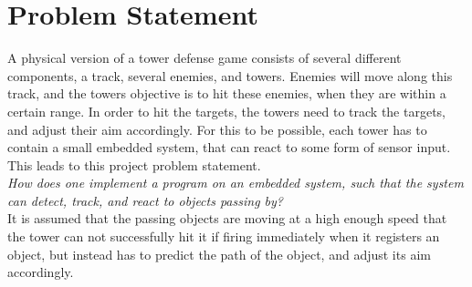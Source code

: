 \section{Problem Statement}\label{sec:problemstatement}\label{\automlabel}
A physical version of a tower defense game consists of several different components, a track, several enemies, and towers. Enemies will move along this track, and the towers objective is to hit these enemies, when they are within a certain range. In order to hit the targets, the towers need to track the targets, and adjust their aim accordingly. For this to be possible, each tower has to contain a small embedded system, that can react to some form of sensor input. This leads to this project problem statement. \\

\textit{How does one implement a program on an embedded system, such that the system can detect, track, and react to objects passing by?}\\

It is assumed that the passing objects are moving at a high enough speed that the tower can not successfully hit it if firing immediately when it registers an object, but instead has to predict the path of the object, and adjust its aim accordingly.
\eal